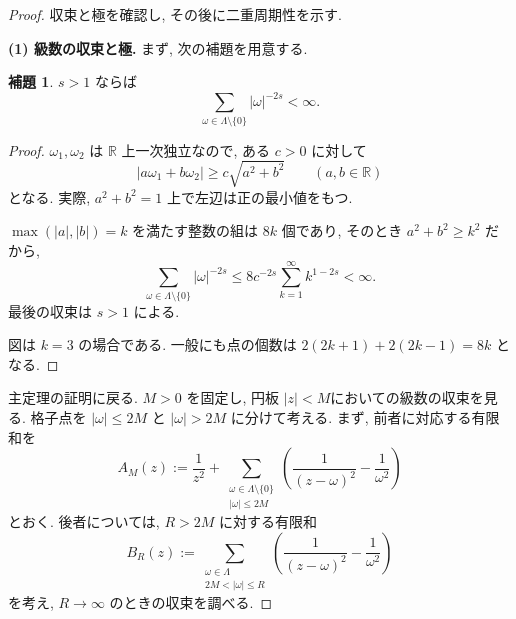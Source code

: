 \documentclass[dvipdfmx,a4paper,11pt]{article} %
\newcommand{\R}{\mathbb{R}}
\theoremstyle{definition}
\numberwithin{equation}{section}
\newtheorem{lem}[thm]{補題}
\begin{document}
\begin{proof}
収束と極を確認し, その後に二重周期性を示す.

\medskip
\textbf{(1) 級数の収束と極.}
まず, 次の補題を用意する.

\begin{lem}\label{O-M143}
$s>1$ ならば
\[
\sum_{\omega\in\Lambda\setminus\{0\}}|\omega|^{-2s}<\infty.
\]
\end{lem}

\begin{proof}
$\omega_1,\omega_2$ は $\R$ 上一次独立なので, 
ある $c>0$ に対して
\[
|a\omega_1+b\omega_2|\geq c\sqrt{a^2+b^2}
\qquad(a,b\in\R)
\]
となる.
実際, $a^2+b^2=1$ 上で左辺は正の最小値をもつ.

$\max(|a|,|b|)=k$ を満たす整数の組は $8k$ 個であり, 
そのとき $a^2+b^2\geq k^2$ だから, 
\[
\sum_{\omega\in\Lambda\setminus\{0\}}|\omega|^{-2s}
\leq 8c^{-2s}\sum_{k=1}^{\infty}k^{1-2s}<\infty.
\]
最後の収束は $s>1$ による.
\begin{center}
\end{center}
図は $k=3$ の場合である.
一般にも点の個数は $2(2k+1)+2(2k-1)=8k$ となる.
\end{proof}

主定理の証明に戻る.
$M>0$ を固定し, 円板 $|z|<M$においての級数の収束を見る. 
格子点を $|\omega|\leq2M$ と
$|\omega|>2M$ に分けて考える.
まず, 前者に対応する有限和を
\[
A_M(z):=\frac1{z^2}
+\sum_{\substack{\omega\in\Lambda\setminus\{0\}\\|\omega|\leq2M}}
\left(\frac1{(z-\omega)^2}-\frac1{\omega^2}\right)
\]
とおく.
後者については, $R>2M$ に対する有限和
\[
B_R(z):=
\sum_{\substack{\omega\in\Lambda\\2M<|\omega|\leq R}}
\left(\frac1{(z-\omega)^2}-\frac1{\omega^2}\right)
\]
を考え, $R\to\infty$ のときの収束を調べる.


\end{proof}
\end{document}
